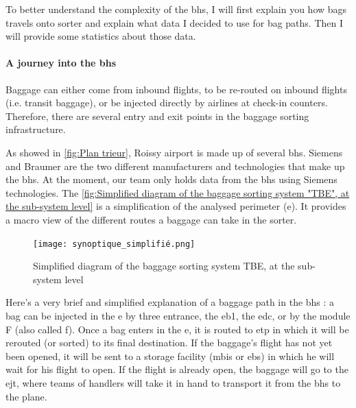 \documentclass[12pt]{article}
\begin{document}
To better understand the complexity of the \acrshort{bhs}, I will first explain you how bags travels onto sorter and explain what data I decided to use for bag paths. Then I will provide some statistics about those data.

\paragraph{A journey into the \acrshort{bhs}} Baggage can either come from inbound flights, to be re-routed on inbound flights (i.e. transit baggage), or be injected directly by airlines at check-in counters. Therefore, there are several entry and exit points in the baggage sorting infrastructure.

As showed in \autoref{fig:Plan trieur}, Roissy airport is made up of several \acrlong{bhs}. Siemens and Braumer are the two different manufacturers and technologies that make up the \acrshort{bhs}. At the moment, our team only holds data from the \acrshort{bhs} using Siemens technologies. The \autoref{fig:Simplified diagram of the baggage sorting system "TBE", at the sub-system level} is a simplification of the analysed perimeter (\acrshort{e}). It provides a macro view of the different routes a baggage can take in the sorter.


\begin{figure}[h]
    \texttt{[image: synoptique\_simplifié.png]}\\
    \caption{Simplified diagram of the baggage sorting system TBE, at the sub-system level}
    \label{fig:Simplified diagram of the baggage sorting system "TBE", at the sub-system level}
\end{figure}
\FloatBarrier
Here's a very brief and simplified explanation of a baggage path in the  \acrshort{bhs} : a bag can be injected in the \acrshort{e} by three entrance, the \acrlong{eb1}, the \acrlong{edc}, or by the module F (also called \acrshort{f}). Once a bag enters in the \acrshort{e}, it is routed to \acrshort{etp} in which it will be rerouted (or sorted) to its final destination. If the baggage's flight has not yet been opened, it will be sent to a storage facility (\acrshort{mbis} or \acrshort{ebs}) in which he will wait for his flight to open. If the flight is already open, the baggage will go to the \acrshort{ejt}, where teams of handlers will take it in hand to transport it from the \acrshort{bhs} to the plane.
\end{document}
